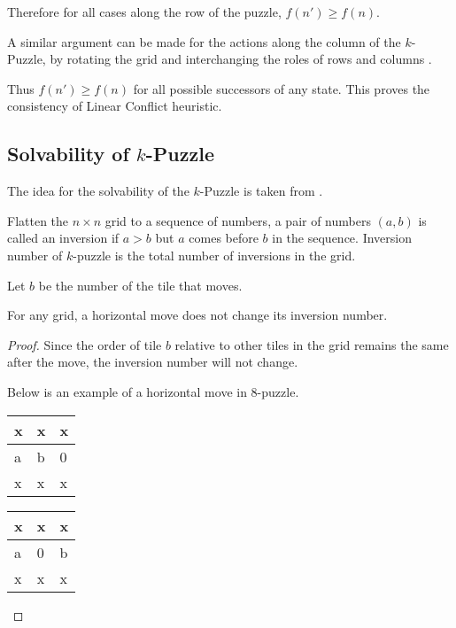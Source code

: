 \documentclass{llncs}
\begin{document}
Therefore for all cases along the row of the puzzle, $f(n') \geq f(n)$. 

A similar argument can be made for the actions along the column of the $k$-Puzzle, by rotating the grid and interchanging the roles of rows and columns .

Thus $f(n') \geq f(n)$ for all possible successors of any state. This proves the consistency of Linear Conflict heuristic.

\subsection{Solvability of $k$-Puzzle}
The idea for the solvability of the $k$-Puzzle is taken from \cite{solvability}.
\begin{definition}
Flatten the $n \times n$ grid to a sequence of numbers, a pair of numbers $(a,b)$ is called an inversion if $a>b$ but $a$ comes before $b$ in the sequence. Inversion number of $k$-puzzle is the total number of inversions in the grid.
\end{definition}

Let $b$ be the number of the tile that moves.

\begin{lemma}
For any grid, a horizontal move does not change its inversion number.
\end{lemma}

\begin{proof}
Since the order of tile $b$ relative to other tiles in the grid remains the same after the move, the inversion number will not change.

Below is an example of a horizontal move in $8$-puzzle.
\begin{table}
	\centering
	\label{tab1}
	\begin{tabular}{|p{2mm}|p{2mm}|p{2mm}|} \hline
	x & x & x\\ \hline
	a & b & 0\\ \hline
	x & x & x\\ \hline
	\end{tabular}
\end{table}
\begin{table}
	\centering
	\label{tab2}
	\begin{tabular}{|p{2mm}|p{2mm}|p{2mm}|} \hline
	x & x & x\\ \hline
	a & 0 & b\\ \hline
	x & x & x\\ \hline
	\end{tabular}
\end{table}
\end{proof}
\end{document}
